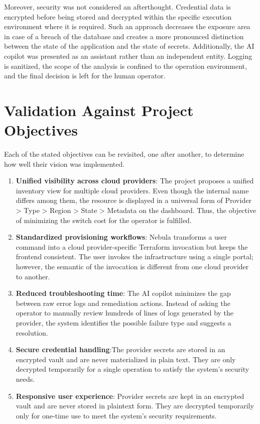 Moreover, security was not considered an afterthought. Credential data is encrypted before being stored and decrypted within the specific execution environment where it is required. Such an approach decreases the exposure area in case of a breach of the database and creates a more pronounced distinction between the state of the application and the state of secrets. Additionally, the AI copilot was presented as an assistant rather than an independent entity. Logging is sanitized, the scope of the analysis is confined to the operation environment, and the final decision is left for the human operator.


\section{Validation Against Project Objectives}
Each of the stated objectives can be revisited, one after another, to determine how well their vision was implemented.

\begin{enumerate}
    \item \textbf{Unified visibility across cloud providers}: The project proposes a unified inventory view for multiple cloud providers. Even though the internal name differs among them, the resource is displayed in a universal form of Provider > Type > Region > State > Metadata on the dashboard. Thus, the objective of minimizing the switch cost for the operator is fulfilled.
    \item \textbf{Standardized provisioning workflows}: Nebula transforms a user command into a cloud provider-specific Terraform invocation but keeps the frontend consistent. The user invokes the infrastructure using a single portal; however, the semantic of the invocation is different from one cloud provider to another.
    \item \textbf{Reduced troubleshooting time}: The AI copilot minimizes the gap between raw error logs and remediation actions. Instead of asking the operator to manually review hundreds of lines of logs generated by the provider, the system identifies the possible failure type and suggests a resolution.
    \item \textbf{Secure credential handling}:The provider secrets are stored in an encrypted vault and are never materialized in plain text. They are only decrypted temporarily for a single operation to satisfy the system's security needs.
    \item \textbf{Responsive user experience}: Provider secrets are kept in an encrypted vault and are never stored in plaintext form. They are decrypted temporarily only for one-time use to meet the system’s security requirements.

\end{enumerate}

